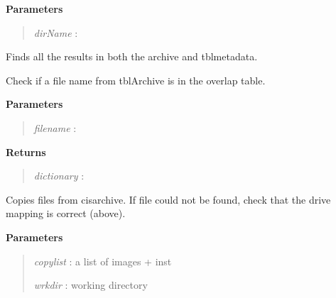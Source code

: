 \documentclass[letterpaper,10pt,openany,oneside]{sphinxmanual}
\begin{document}
\begin{fulllineitems}
\begin{fulllineitems}
\textbf{Parameters}
\begin{quote}

\emph{dirName} :
\end{quote}

\end{fulllineitems}


\begin{fulllineitems}
\label{code:Database.Database.bothArchiveandMetadata}
Finds all the results in both the archive and tblmetadata.

\end{fulllineitems}


\begin{fulllineitems}
\label{code:Database.Database.checkTblArchiveOverLapsTblMetadata}
Check if a file name from tblArchive is in the overlap table.

\textbf{Parameters}
\begin{quote}

\emph{filename}   :
\end{quote}

\textbf{Returns}
\begin{quote}

\emph{dictionary} :
\end{quote}

\end{fulllineitems}


\begin{fulllineitems}
\label{code:Database.Database.copyfiles}
Copies files from cisarchive.  If file could not be found, check that the 
drive mapping is correct (above).

\textbf{Parameters}
\begin{quote}

\emph{copylist} : a list of images + inst

\emph{wrkdir}   : working directory
\end{quote}

\end{fulllineitems}


\end{fulllineitems}
\end{document}
